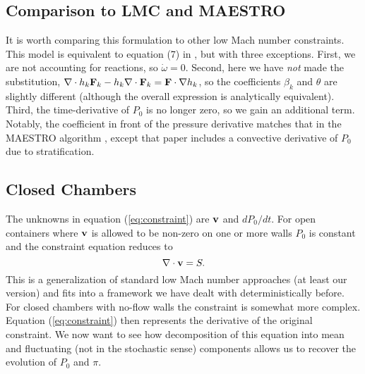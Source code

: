 \documentclass[final]{siamltex}
\def\Fb {{\bf F}}
\def\vb {{\bf v}}
\begin{document}
\subsection{Comparison to LMC and MAESTRO}
It is worth comparing this formulation to other low Mach number constraints.
This model is equivalent to equation (7) in \cite{DayBell:2000},
but with three exceptions.  First,
we are not accounting for reactions, so $\dot\omega=0$.  Second, here we have 
{\it not} made the substitution, 
$\nabla\cdot h_k\Fb_k - h_k\nabla\cdot\Fb_k = \Fb\cdot\nabla h_k$, so the coefficients
$\beta_k$ and $\theta$ are slightly different (although the overall expression is
analytically equivalent).  Third, the time-derivative of $P_0$ is no longer zero,
so we gain an additional term.  Notably, the coefficient in front of the pressure 
derivative matches that in the MAESTRO algorithm \cite{MAESTROIII},
except that paper includes a convective derivative of $P_0$ due to stratification.

\subsection{Closed Chambers}
The unknowns in equation (\ref{eq:constraint}) are $\vb$ and $d P_0/d t$.
For open containers where $\vb$ is allowed to be non-zero on one or more walls $P_0$
is constant and the constraint equation reduces to
\begin{equation}
\nabla\cdot\vb = S.
\end{equation}
This is a generalization of standard low Mach number approaches (at least our version) 
and fits into
a framework we have dealt with deterministically before.\\

For closed chambers with no-flow walls the constraint is somewhat more complex.
Equation (\ref{eq:constraint}) then represents the derivative of the original
constraint.  We now want to see how
decomposition of this equation into mean and fluctuating (not in the stochastic sense)
components allows us to recover the evolution of $P_0$ and $\pi$.\\
\end{document}
